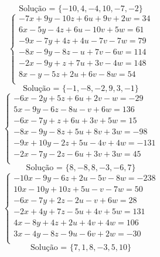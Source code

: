 \documentclass[12pt,oneside,a4paper]{article}
\begin{document}
\begin{equation*}
\text{Solução = }\{-10,4,-4,10,-7,-2\}
\end{equation*}
\vspace{\baselineskip}
\begin{equation*}
\begin{cases}
-7x+9y-10z+6u+9v+2w=34 \\
6x-5y-4z+6u-10v+5w=61 \\
-9x-7y+4z+4u-7v-7w=79 \\
-8x-9y-8z-u+7v-6w=114 \\
-2x-9y+z+7u+3v-4w=148 \\
8x-y-5z+2u+6v-8w=54 \\
\end{cases}
\end{equation*}
\begin{equation*}
\text{Solução = }\{-1,-8,-2,9,3,-1\}
\end{equation*}
\vspace{\baselineskip}
\begin{equation*}
\begin{cases}
-6x-2y+5z+6u+2v-w=-29 \\
5x-9y-6z-8u-v+6w=136 \\
-6x-7y+z+6u+3v+5w=15 \\
-8x-9y-8z+5u+8v+3w=-98 \\
-9x+10y-2z+5u-4v+4w=-131 \\
-2x-7y-2z-6u+3v+3w=45 \\
\end{cases}
\end{equation*}
\begin{equation*}
\text{Solução = }\{8,-8,8,-3,-6,7\}
\end{equation*}
\vspace{\baselineskip}
\begin{equation*}
\begin{cases}
-10x-9y-6z+2u-5v-8w=-238 \\
10x-10y+10z+5u-v-7w=50 \\
-6x-7y+2z-2u-v+6w=28 \\
-2x+4y+7z-5u+4v+5w=131 \\
4x-8y+4z+2u+4v+4w=106 \\
3x-4y-8z-9u-6v+2w=-30 \\
\end{cases}
\end{equation*}
\begin{equation*}
\text{Solução = }\{7,1,8,-3,5,10\}
\end{equation*}
\end{document}
